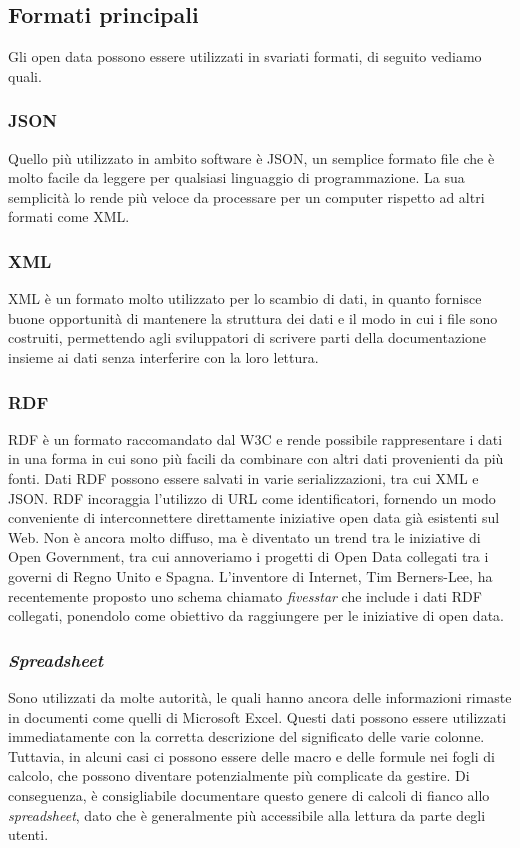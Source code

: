 \subsection{Formati principali}
Gli open data possono essere utilizzati in svariati formati, di seguito vediamo quali.
\subsubsection{JSON}
Quello più utilizzato in ambito software è JSON, un semplice formato file che è molto facile da leggere per qualsiasi linguaggio di programmazione. La sua semplicità lo rende più veloce da processare per un computer rispetto ad altri formati come XML.
\subsubsection{XML}
XML è un formato molto utilizzato per lo scambio di dati, in quanto fornisce buone opportunità di mantenere la struttura dei dati e il modo in cui i file sono costruiti, permettendo agli sviluppatori di scrivere parti della documentazione insieme ai dati senza interferire con la loro lettura.
\subsubsection{RDF}
RDF è un formato raccomandato dal W3C e rende possibile rappresentare i dati in una forma in cui sono più facili da combinare con altri dati provenienti da più fonti. Dati RDF possono essere salvati in varie serializzazioni, tra cui XML e JSON. RDF incoraggia l'utilizzo di URL come identificatori, fornendo un modo conveniente di interconnettere direttamente iniziative open data già esistenti sul Web. Non è ancora molto diffuso, ma è diventato un trend tra le iniziative di Open Government, tra cui annoveriamo i progetti di Open Data collegati tra i governi di Regno Unito e Spagna. L'inventore di Internet, Tim Berners-Lee, ha recentemente proposto uno schema chiamato \textit{fivesstar} che include i dati RDF collegati, ponendolo come obiettivo da raggiungere per le iniziative di open data.
\subsubsection{\textit{Spreadsheet}}
Sono utilizzati da molte autorità, le quali hanno ancora delle informazioni rimaste in documenti come quelli di Microsoft Excel. Questi dati possono essere utilizzati immediatamente con la corretta descrizione del significato delle varie colonne. Tuttavia, in alcuni casi ci possono essere delle macro e delle formule nei fogli di calcolo, che possono diventare potenzialmente più complicate da gestire. Di conseguenza, è consigliabile documentare questo genere di calcoli di fianco allo \textit{spreadsheet}, dato che è generalmente più accessibile alla lettura da parte degli utenti.
